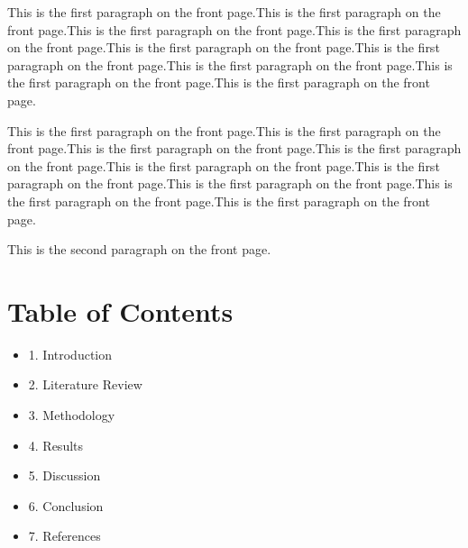 \documentclass{article}
\begin{document}
This is the first paragraph on the front page.This is the first paragraph on the front page.This is the first paragraph on the front page.This is the first paragraph on the front page.This is the first paragraph on the front page.This is the first paragraph on the front page.This is the first paragraph on the front page.This is the first paragraph on the front page.This is the first paragraph on the front page.\par
This is the first paragraph on the front page.This is the first paragraph on the front page.This is the first paragraph on the front page.This is the first paragraph on the front page.This is the first paragraph on the front page.This is the first paragraph on the front page.This is the first paragraph on the front page.This is the first paragraph on the front page.This is the first paragraph on the front page.\par
This is the second paragraph on the front page.\par

\newpage
\section{Table of Contents}
\begin{itemize}
\item 1. Introduction
\item 2. Literature Review
\item 3. Methodology
\item 4. Results
\item 5. Discussion
\item 6. Conclusion
\item 7. References
\end{itemize}
\end{document}
